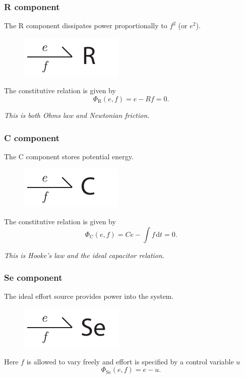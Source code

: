 \documentclass[11pt,reqno]{beamer}
\newcommand{\df}[1]{\mspace{2mu}  \mathrm{d}#1}
\begin{document}
\begin{frame}
\frametitle{R component}
The R component dissipates power proportionally to $f^2$ (or $e^2$).
\begin{figure}
	\includegraphics{oneport-R.pdf}
\end{figure}
The constitutive relation is given by
\[
\Phi_\text{R}(e,f) = e - Rf = 0.
\]
\vspace{10pt}

\begin{center}
\emph{This is both Ohms law and Newtonian friction.}
\end{center}
\end{frame}
\begin{frame}
\frametitle{C component}
The C component stores potential energy.
\begin{figure}
	\includegraphics{oneport-C.pdf}
\end{figure}
The constitutive relation is given by
\[
\Phi_\text{C}(e,f) = Ce - \int f \df{t} = 0.
\]
\vspace{10pt}

\begin{center}
\emph{This is Hooke's law and the ideal capacitor relation.}
\end{center}
\end{frame}
\begin{frame}
\frametitle{Se component}
The ideal effort source provides power into the system.
\begin{figure}
\includegraphics{oneport-Se.pdf}
\end{figure}
Here $f$ is allowed to vary freely and effort is specified by a control variable $u$
\[
\Phi_\text{Se}(e,f) = e - u.
\]

\end{frame}
\end{document}
